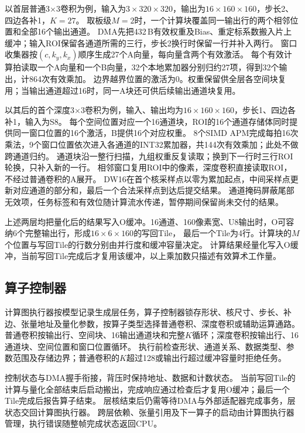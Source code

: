 以首层普通3$\times$3卷积为例，输入为$3\times320\times320$，输出为$16\times160\times160$，步长2、四边各补1，$K=27$。
取板级$M=2$时，一个计算块覆盖同一输出行的两个相邻位置和全部16个输出通道。
DMA先把432\,B有效权重及Bias、重定标系数搬入片上缓冲；输入ROI保留各通道所需的三行，步长2换行时保留一行并补入两行。
窗口收集器按$(c,k_y,k_x)$顺序生成27个A向量，每向量含两个有效激活。
每个有效计算拍读取一个A向量和一个B向量，32个本地累加器分别归约27项，得到32个输出，计864次有效乘加。
边界越界位置的激活为0。权重保留供全层各空间块复用；当输出通道超过16时，同一A块还可供后续输出通道块复用。

以其后的首个深度3$\times$3卷积为例，输入、输出均为$16\times160\times160$，步长1、四边各补1，输入为S8。
每个空间位置对应一个16通道块，ROI的16个通道存储体同时提供同一窗口位置的16个激活，B提供16个对应权重。
8个SIMD APM完成每拍16次乘法，9个窗口位置依次进入各通道的INT32累加器，共144次有效乘加；此处不做跨通道归约。
通道块沿一整行扫描，九组权重反复读取；换到下一行时三行ROI轮换，只补入新的一行。
相邻窗口复用ROI中的像素，深度卷积直接读取ROI，不经过普通卷积的A展开。
DW16在首个核采样点以零为累加起点，中间采样点更新对应通道的部分和，最后一个合法采样点到达后提交结果。
通道掩码屏蔽尾部无效项，任务标签和有效位随计算流水传递，暂停期间保留尚未交付的结果。

上述两层均把量化后的结果写入O缓冲。16通道、160像素宽、U8输出时，O可容纳6个完整输出行，形成$16\times6\times160$的写回Tile，
最后一个Tile为4行。计算块的$M$个位置与写回Tile的行数分别由并行度和缓冲容量决定。
计算结果经量化写入O缓冲，当前写回Tile完成后才复用该缓冲，以上乘加数只描述有效算术工作量。

\subsection{算子控制器}

计算图执行器按模型记录生成层任务，算子控制器锁存形状、核尺寸、步长、补边、张量地址及量化参数，按算子类型选择普通卷积、深度卷积或辅助运算通路。
普通卷积按输出行、空间块、16输出通道块和完整$K$循环；深度卷积按输出行、16通道块、空间位置和窗口位置循环。
执行前检查形状、通道关系、数据类型、参数范围及存储边界；普通卷积的$K$超过128或输出行超过缓冲容量时拒绝任务。

控制状态与DMA握手衔接，背压时保持地址、数据和计数状态。
当前写回Tile的计算与量化全部结束后启动搬出，完成响应通过检查后才复用O缓冲；最后一个Tile完成后报告算子结束。
层核结束后仍需等待DMA与外部适配器完成事务，层状态交回计算图执行器。
跨层依赖、张量引用及下一算子的启动由计算图执行器管理，执行错误随整帧完成状态返回CPU。

